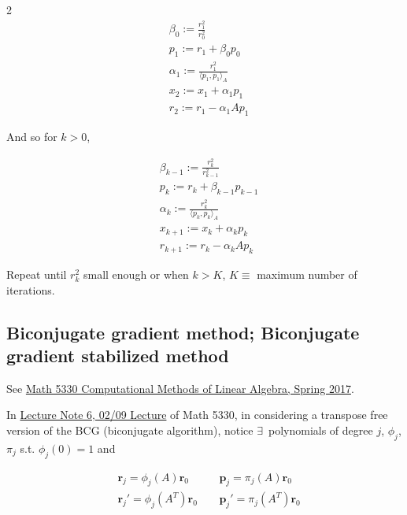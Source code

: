 \documentclass[10pt]{amsart}
\begin{document}
\begin{multicols*}{2}
\begin{equation}\label{Eq:ConjugateGradientAlgorithmFirstStep}
\begin{aligned}
	& \beta_0 := \frac{r_1^2}{r_0^2} \\
	& p_1 := r_1 + \beta_0 p_0 \\
	& \alpha_1 := \frac{r_1^2 }{ \langle p_1 , p_1 \rangle_A} \\
	& x_2 := x_1 + \alpha_1 p_1 \\
	& r_2 := r_1 - \alpha_1 Ap_1
\end{aligned}
\end{equation}

And so for $k > 0$,

\begin{equation}\label{Eq:ConjugateGradientAlgorithmkStep}
\begin{aligned}
	& \beta_{k-1} := \frac{r_k^2}{r_{k-1}^2} \\
	& p_k := r_k + \beta_{k-1} p_{k-1} \\
	& \alpha_k := \frac{r_k^2 }{ \langle p_k , p_k \rangle_A} \\
	& x_{k+1} := x_k + \alpha_k p_k \\
	& r_{k+1} := r_k - \alpha_k Ap_k
\end{aligned}
\end{equation}

Repeat until $r_k^2$ small enough or when $k> K$, $K \equiv$ maximum number of iterations.

\subsection{Biconjugate gradient method; Biconjugate gradient stabilized method}

See \href{https://utminers.utep.edu/xzeng/2017spring_math5330/MATH_5330_Computational_Methods_of_Linear_Algebra.html}{Math 5330 Computational Methods of Linear Algebra, Spring 2017}.

In \href{https://utminers.utep.edu/xzeng/2017spring_math5330/MATH_5330_Computational_Methods_of_Linear_Algebra_files/ln06.pdf}{Lecture Note 6, 02/09 Lecture} of Math 5330, in considering a transpose free version of the BCG (biconjugate algorithm), notice $\exists \, $ polynomials of degree $j$, $\phi_j$, $\pi_j$ s.t. $\phi_j(0) = 1$ and

\begin{equation}\label{Eq:BiconjugateGradientPolynomialForm}
\begin{aligned}
	& \mathbf{r}_j = \phi_j(A) \mathbf{r}_0 \quad \, & \mathbf{p}_j = \pi_j(A) \mathbf{r}_0 \\ 
	& \mathbf{r}_j' = \phi_j(A^T) \mathbf{r}_0 \quad \, & \mathbf{p}_j' = \pi_j(A^T) \mathbf{r}_0
\end{aligned}
\end{equation}


\end{multicols*}
\end{document}

